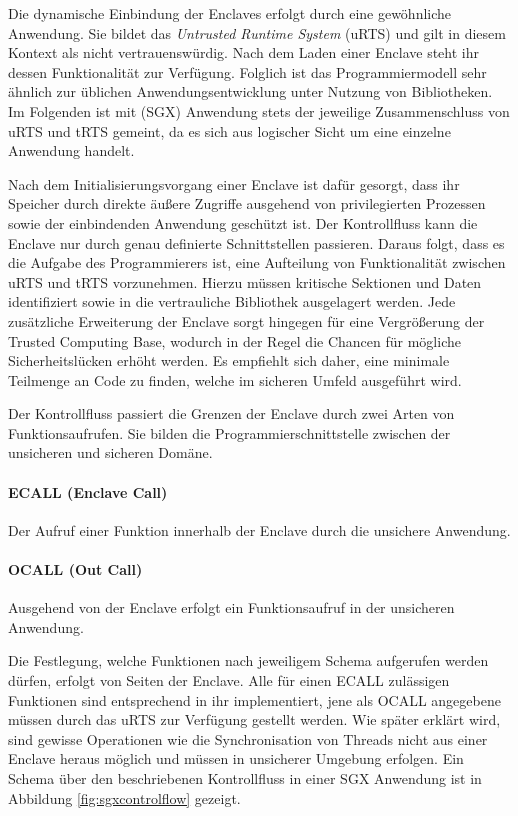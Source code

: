 Die dynamische Einbindung der Enclaves erfolgt durch eine gewöhnliche Anwendung. Sie bildet das \textit{Untrusted Runtime System} (uRTS) und gilt in diesem Kontext als nicht vertrauenswürdig. Nach dem Laden einer Enclave steht ihr dessen Funktionalität zur Verfügung. Folglich ist das Programmiermodell sehr ähnlich zur üblichen Anwendungsentwicklung unter Nutzung von Bibliotheken. Im Folgenden ist mit (SGX) Anwendung stets der jeweilige Zusammenschluss von uRTS und tRTS gemeint, da es sich aus logischer Sicht um eine einzelne Anwendung handelt.

Nach dem Initialisierungsvorgang einer Enclave ist dafür gesorgt, dass ihr Speicher durch direkte äußere Zugriffe ausgehend von privilegierten Prozessen sowie der einbindenden Anwendung geschützt ist. Der Kontrollfluss kann die Enclave nur durch genau definierte Schnittstellen passieren. Daraus folgt, dass es die Aufgabe des Programmierers ist, eine Aufteilung von Funktionalität zwischen uRTS und tRTS vorzunehmen. Hierzu müssen kritische Sektionen und Daten identifiziert sowie in die vertrauliche Bibliothek ausgelagert werden. Jede zusätzliche Erweiterung der Enclave sorgt hingegen für eine Vergrößerung der Trusted Computing Base, wodurch in der Regel die Chancen für mögliche Sicherheitslücken erhöht werden. Es empfiehlt sich daher, eine minimale Teilmenge an Code zu finden, welche im sicheren Umfeld ausgeführt wird. 

Der Kontrollfluss passiert die Grenzen der Enclave durch zwei Arten von Funktionsaufrufen. Sie bilden die Programmierschnittstelle zwischen der unsicheren und sicheren Domäne.

\paragraph{ECALL (Enclave Call) } Der Aufruf einer Funktion innerhalb der Enclave durch die unsichere Anwendung.

\paragraph{OCALL (Out Call)} Ausgehend von der Enclave erfolgt ein Funktionsaufruf in der unsicheren Anwendung.

Die Festlegung, welche Funktionen nach jeweiligem Schema aufgerufen werden dürfen, erfolgt von Seiten der Enclave. Alle für einen ECALL zulässigen Funktionen sind entsprechend in ihr implementiert, jene als OCALL angegebene müssen durch das uRTS zur Verfügung gestellt werden. Wie später erklärt wird, sind gewisse Operationen wie die Synchronisation von Threads nicht aus einer Enclave heraus möglich und müssen in unsicherer Umgebung erfolgen. Ein Schema über den beschriebenen Kontrollfluss in einer SGX Anwendung ist in Abbildung \ref{fig:sgxcontrolflow} gezeigt.

